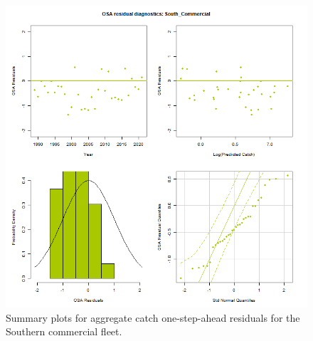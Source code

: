 \documentclass[
]{article}
\begin{document}
\begin{figure}

{\centering \includegraphics[width=1\linewidth]{../2023.RT.Runs/Run34/plots_png/diagnostics/OSA_resid_catch_4panel_South_Commercial} 

}

\caption{Summary plots for aggregate catch one-step-ahead residuals for the Southern commercial fleet.}\label{fig:osa-South-comm-catch-summ}
\end{figure}
\end{document}
